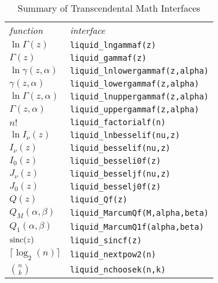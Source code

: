 \begin{table*}
\caption{Summary of Transcendental Math Interfaces}
\label{tab:math:transcendentals}
\centering
{\small
    \begin{tabular*}{0.65\textwidth}{l@{\extracolsep{\fill}}l}
    \toprule
    {\it function} &
    {\it interface}\\\otoprule
    $\ln\Gamma(z)$          & {\tt liquid\_lngammaf(z)} \\
    $   \Gamma(z)$          & {\tt liquid\_gammaf(z)} \\
    $\ln\gamma(z,\alpha)$   & {\tt liquid\_lnlowergammaf(z,alpha)} \\
    $   \gamma(z,\alpha)$   & {\tt liquid\_lowergammaf(z,alpha)} \\
    $\ln\Gamma(z,\alpha)$   & {\tt liquid\_lnuppergammaf(z,alpha)} \\
    $   \Gamma(z,\alpha)$   & {\tt liquid\_uppergammaf(z,alpha)} \\
    $n!$                    & {\tt liquid\_factorialf(n)} \\\midrule
    $\ln I_\nu(z)$          & {\tt liquid\_lnbesselif(nu,z)} \\
    $    I_\nu(z)$          & {\tt liquid\_besselif(nu,z)} \\
    $    I_0  (z)$          & {\tt liquid\_besseli0f(z)} \\
    $    J_\nu(z)$          & {\tt liquid\_besseljf(nu,z)} \\
    $    J_0  (z)$          & {\tt liquid\_besselj0f(z)} \\\midrule
    $Q(z)$                  & {\tt liquid\_Qf(z)} \\
    $Q_M(\alpha,\beta)$     & {\tt liquid\_MarcumQf(M,alpha,beta)} \\
    $Q_1(\alpha,\beta)$     & {\tt liquid\_MarcumQ1f(alpha,beta)} \\\midrule
    $\textup{sinc}(z)$              & {\tt liquid\_sincf(z)} \\
    $\lceil\log_2(n)\rceil$ & {\tt liquid\_nextpow2(n)} \\
    ${n \choose k}$         & {\tt liquid\_nchoosek(n,k)} \\\bottomrule
    \end{tabular*}
}
\end{table*}%


% 
%
